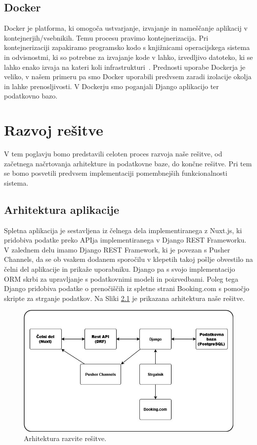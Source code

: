 \documentclass[a4paper,12pt,openright]{book}
\begin{document}
\section{Docker}
Docker je platforma, ki omogoča ustvarjanje, izvajanje in nameščanje aplikacij v kontejnerjih/vsebnikih.
Temu procesu pravimo kontejnerizacija.
Pri kontejnerizaciji zapakiramo programsko kodo s knjižnicami operacijskega sistema in odvisnostmi, ki so potrebne za izvajanje kode v lahko, izvedljivo datoteko, ki se lahko enako izvaja na kateri koli infrastrukturi~\cite{containerization}.
Prednosti uporabe Dockerja je veliko, v našem primeru pa smo Docker uporabili predvsem zaradi izolacije okolja in lahke prenosljivosti.
V Dockerju smo poganjali Django aplikacijo ter podatkovno bazo.

\chapter{Razvoj rešitve}
V tem poglavju bomo predstavili celoten proces razvoja naše rešitve, od začetnega načrtovanja arhitekture in podatkovne baze, do končne rešitve.
Pri tem se bomo posvetili predvsem implementaciji pomembnejših funkcionalnosti sistema.

\section{Arhitektura aplikacije}
Spletna aplikacija je sestavljena iz čelnega dela implementiranega z Nuxt.js, ki pridobiva podatke preko APIja implementiranega v Django REST Frameworku.
V zalednem delu imamo Django REST Framework, ki je povezan s Pusher Channels, da se ob vsakem dodanem sporočilu v klepetih takoj pošlje obvestilo na čelni del aplikacije in prikaže uporabniku.
Django pa s svojo implementacijo ORM skrbi za upravljanje s podatkovnimi modeli in poizvedbami.
Poleg tega Django pridobiva podatke o prenočiščih iz spletne strani Booking.com s pomočjo skripte za strganje podatkov.
Na Sliki \ref{architecture} je prikazana arhitektura naše rešitve.

\begin{figure}[htb] %
\begin{center}
\includegraphics[width=\textwidth]{img/Architecture}
\end{center}
\caption{Arhitektura razvite rešitve.}
\label{architecture}
\end{figure}
\end{document}
